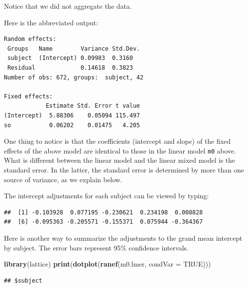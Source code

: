 \documentclass[12pt,]{krantz}
\newenvironment{Shaded}{\begin{snugshade}}{\end{snugshade}}
\newcommand{\CommentTok}[1]{\textcolor[rgb]{0.56,0.35,0.01}{\textit{#1}}}
\newcommand{\DataTypeTok}[1]{\textcolor[rgb]{0.13,0.29,0.53}{#1}}
\newcommand{\DecValTok}[1]{\textcolor[rgb]{0.00,0.00,0.81}{#1}}
\newcommand{\KeywordTok}[1]{\textcolor[rgb]{0.13,0.29,0.53}{\textbf{#1}}}
\newcommand{\NormalTok}[1]{#1}
\newcommand{\OperatorTok}[1]{\textcolor[rgb]{0.81,0.36,0.00}{\textbf{#1}}}
\newcommand{\OtherTok}[1]{\textcolor[rgb]{0.56,0.35,0.01}{#1}}
\begin{document}
Notice that we did not aggregate the data.

Here is the abbreviated output:

\begin{verbatim}
Random effects:
 Groups   Name        Variance Std.Dev.
 subject  (Intercept) 0.09983  0.3160  
 Residual             0.14618  0.3823  
Number of obs: 672, groups:  subject, 42

Fixed effects:
            Estimate Std. Error t value
(Intercept)  5.88306    0.05094 115.497
so           0.06202    0.01475   4.205
\end{verbatim}

One thing to notice is that the coefficients (intercept and slope) of the fixed effects of the above model are identical to those in the linear model \texttt{m0} above. What is different between the linear model and the linear mixed model is the standard error. In the latter, the standard error is determined by more than one source of variance, as we explain below.

The intercept adjustments for each subject can be viewed by typing:

\begin{Shaded}
\end{Shaded}

\begin{verbatim}
##  [1] -0.103928  0.077195 -0.230621  0.234198  0.008828
##  [6] -0.095363 -0.205571 -0.155371  0.075944 -0.364367
\end{verbatim}

Here is another way to summarize the adjustments to the grand mean intercept by subject. The error bars represent 95\% confidence intervals.

\begin{Shaded}
\begin{Highlighting}[]
\KeywordTok{library}\NormalTok{(lattice)}
\KeywordTok{print}\NormalTok{(}\KeywordTok{dotplot}\NormalTok{(}\KeywordTok{ranef}\NormalTok{(m0.lmer, }\DataTypeTok{condVar =} \OtherTok{TRUE}\NormalTok{)))}
\end{Highlighting}
\end{Shaded}

\begin{verbatim}
## $subject
\end{verbatim}
\end{document}
